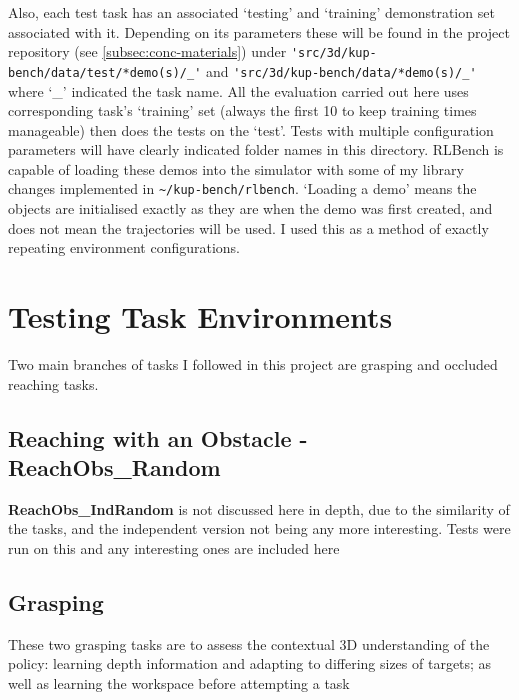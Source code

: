 Also, each test task has an associated `testing' and `training' demonstration set associated with it. Depending on its parameters these will be found in the project repository (see \ref{subsec:conc-materials}) under \verb|'src/3d/kup-bench/data/test/*demo(s)/_'| and \verb|'src/3d/kup-bench/data/*demo(s)/_'| where `\_' indicated the task name. All the evaluation carried out here uses corresponding task's `training' set (always the first 10 to keep training times manageable) then does the tests on the `test'. Tests with multiple configuration parameters will have clearly indicated folder names in this directory. RLBench is capable of loading these demos into the simulator with some of my library changes implemented in \verb|~/kup-bench/rlbench|. `Loading a demo' means the objects are initialised exactly as they are when the demo was first created, and does not mean the trajectories will be used. I used this as a method of exactly repeating environment configurations.

\section{Testing Task Environments}
Two main branches of tasks I followed in this project are grasping and occluded reaching tasks.

\subsection{Reaching with an Obstacle - \textbf{ReachObs\_Random}}

\textbf{ReachObs\_IndRandom} is not discussed here in depth, due to the similarity of the tasks, and the independent version not being any more interesting. Tests were run on this and any interesting ones are included here 

\subsection{Grasping}
These two grasping tasks are to assess the contextual 3D understanding of the policy: learning depth information and adapting to differing sizes of targets; as well as learning the workspace before attempting a task 

